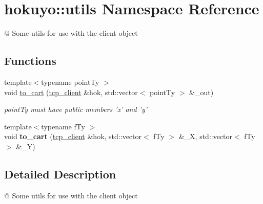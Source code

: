 \hypertarget{namespacehokuyo_1_1utils}{\section{hokuyo\-:\-:utils Namespace Reference}
\label{namespacehokuyo_1_1utils}
}


@ Some utils for use with the client object  


\subsection*{Functions}
\begin{DoxyCompactItemize}
\item 
\hypertarget{namespacehokuyo_1_1utils_a805379cd7e9926d418444637e01a34d4}{{\footnotesize template$<$typename point\-Ty $>$ }\\void \hyperlink{namespacehokuyo_1_1utils_a805379cd7e9926d418444637e01a34d4}{to\-\_\-cart} (\hyperlink{classhokuyo_1_1tcp__client}{tcp\-\_\-client} \&hok, std\-::vector$<$ point\-Ty $>$ \&\-\_\-out)}\label{namespacehokuyo_1_1utils_a805379cd7e9926d418444637e01a34d4}

\begin{DoxyCompactList}\small\item\em point\-Ty must have public members 'x' and 'y' \end{DoxyCompactList}\item 
\hypertarget{namespacehokuyo_1_1utils_a4e669ffa577faa384d9b7b32a725ff7a}{{\footnotesize template$<$typename f\-Ty $>$ }\\void {\bfseries to\-\_\-cart} (\hyperlink{classhokuyo_1_1tcp__client}{tcp\-\_\-client} \&hok, std\-::vector$<$ f\-Ty $>$ \&\-\_\-\-X, std\-::vector$<$ f\-Ty $>$ \&\-\_\-\-Y)}\label{namespacehokuyo_1_1utils_a4e669ffa577faa384d9b7b32a725ff7a}

\end{DoxyCompactItemize}


\subsection{Detailed Description}
@ Some utils for use with the client object 